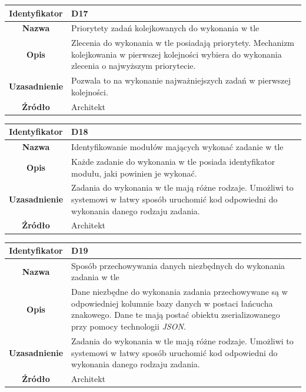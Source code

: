 \begin{table}[H]
\centering
\begin{tabular}{ | >{\bfseries}c | p{11cm} | }
\hline
%
Identyfikator & D17 \\ \hline
Nazwa & Priorytety zadań kolejkowanych do wykonania w tle \\ \hline
Opis & Zlecenia do wykonania w tle posiadają priorytety. Mechanizm kolejkowania w pierwszej kolejności wybiera do wykonania zlecenia o najwyższym priorytecie. \\ \hline
Uzasadnienie & Pozwala to na wykonanie najważniejszych zadań w pierwszej kolejności. \\ \hline
Źródło & Architekt \\ \hline
%
\end{tabular}
\end{table}

\begin{table}[H]
\centering
\begin{tabular}{ | >{\bfseries}c | p{11cm} | }
\hline
%
Identyfikator & D18 \\ \hline
Nazwa & Identyfikowanie modułów mających wykonać zadanie w tle \\ \hline
Opis &  	Każde zadanie do wykonania w tle posiada identyfikator modułu, jaki powinien je wykonać. \\ \hline
Uzasadnienie & Zadania do wykonania w tle mają różne rodzaje. Umożliwi to systemowi w łatwy sposób uruchomić kod odpowiedni do wykonania danego rodzaju zadania. \\ \hline
Źródło & Architekt \\ \hline
%
\end{tabular}
\end{table}

\begin{table}[H]
\centering
\begin{tabular}{ | >{\bfseries}c | p{11cm} | }
\hline
%
Identyfikator & D19 \\ \hline
Nazwa &  Sposób przechowywania danych niezbędnych do wykonania zadania w tle \\ \hline
Opis & Dane niezbędne do wykonania zadania przechowywane są w odpowiedniej kolumnie bazy danych w postaci łańcucha znakowego. Dane te mają postać obiektu zserializowanego przy pomocy technologii \textit{JSON}. \\ \hline
Uzasadnienie & Zadania do wykonania w tle mają różne rodzaje. Umożliwi to systemowi w łatwy sposób uruchomić kod odpowiedni do wykonania danego rodzaju zadania. \\ \hline
Źródło & Architekt \\ \hline
%
\end{tabular}
\end{table}

